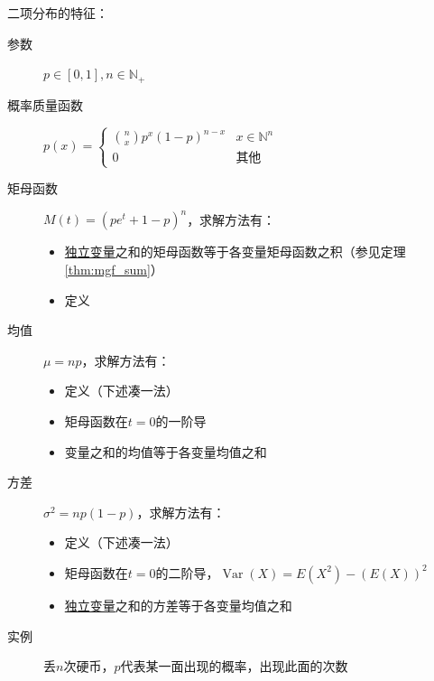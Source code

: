 二项分布的特征：
\begin{description}
    \item[参数] $p \in [0,1], n \in \mathbb{N}_+$
    \item[概率质量函数] $p(x)=\begin{cases}
                \binom{n}{x} p^x (1-p)^{n-x} & x \in \mathbb{N}^n \\
                0                            & \text{其他}
            \end{cases}$
    \item[矩母函数] $M(t)=(p e^t + 1-p)^n$，求解方法有：
        \begin{itemize}
            \item \underline{独立变量}之和的矩母函数等于各变量矩母函数之积（参见定理\ref{thm:mgf_sum}）
            \item 定义
        \end{itemize}
    \item[均值] $\mu=np$，求解方法有：
        \begin{itemize}
            \item 定义（下述凑一法）
            \item 矩母函数在$t=0$的一阶导
            \item 变量之和的均值等于各变量均值之和
        \end{itemize}
    \item[方差] $\sigma^2=np(1-p)$，求解方法有：
        \begin{itemize}
            \item 定义（下述凑一法）
            \item 矩母函数在$t=0$的二阶导，$\operatorname{Var}(X)=E(X^2)-(E(X))^2$
            \item \underline{独立变量}之和的方差等于各变量均值之和
        \end{itemize}
    \item[实例] 丢$n$次硬币，$p$代表某一面出现的概率，出现此面的次数
\end{description}

